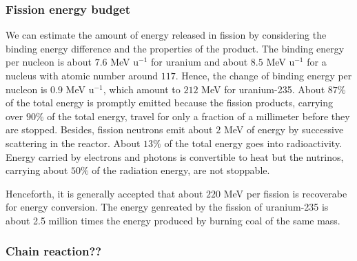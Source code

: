 \documentclass[preprint,aip,cha]{revtex4-1}
\begin{document}
        \subsubsection{Fission energy budget}
        We can estimate the amount of energy released in fission by considering the binding energy difference
        and the properties of the product.
        The binding energy per nucleon is about $7.6$ MeV u${}^{-1}$ for uranium and about $8.5$ MeV u${}^{-1}$
        for a nucleus with atomic number around $117$. Hence, the change of binding energy per nucleon is
        $0.9$ MeV u${}^{-1}$, which amount to $212$ MeV for uranium-235.
        About $87\%$ of the total energy is promptly emitted because
        the fission products, carrying over $90\%$ of the total energy, travel for only a fraction of a
        millimeter before they are stopped. Besides, fission neutrons emit about $2$ MeV of energy by
        successive scattering in the reactor.
        About $13\%$ of the total energy goes into radioactivity. Energy carried by electrons and photons is
        convertible to heat but the nutrinos, carrying about $50\%$ of the radiation energy, are not stoppable.

        Henceforth, it is generally accepted that about $220$ MeV per fission is recoverabe for energy conversion.
        The energy genreated by the fission of uranium-235 is 
        about 2.5 million times the energy produced by burning coal of the same mass.\cite{e17}
        \subsubsection{Chain reaction??}
\end{document}

